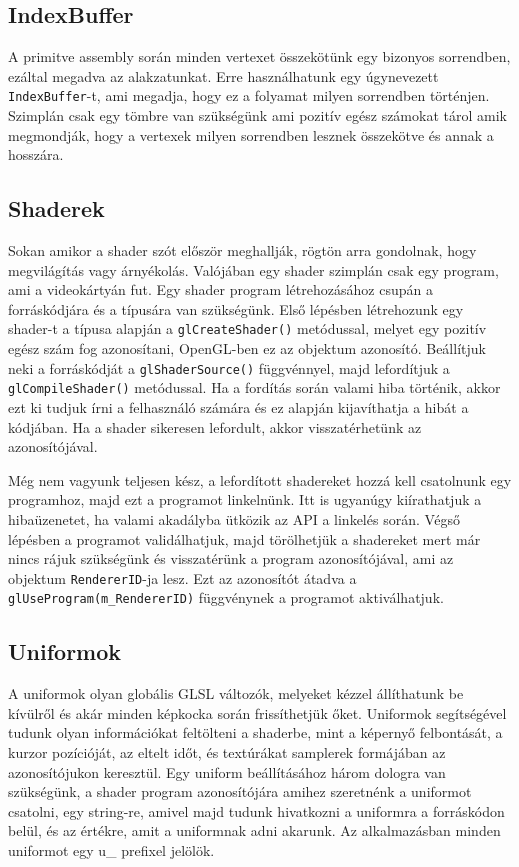 \subsection{IndexBuffer}
A primitve assembly során minden vertexet összekötünk egy bizonyos sorrendben, ezáltal megadva az alakzatunkat. Erre használhatunk egy úgynevezett \texttt{IndexBuffer}-t, ami megadja, hogy ez a folyamat milyen sorrendben történjen. Szimplán csak egy tömbre van szükségünk ami pozitív egész számokat tárol amik megmondják, hogy a vertexek milyen sorrendben lesznek összekötve és annak a hosszára.

\subsection{Shaderek}
Sokan amikor a shader szót először meghallják, rögtön arra gondolnak, hogy megvilágítás vagy árnyékolás. Valójában egy shader szimplán csak egy program, ami a videokártyán fut. Egy shader program létrehozásához csupán a forráskódjára és a típusára van szükségünk. Első lépésben létrehozunk egy shader-t a típusa alapján a \verb|glCreateShader()| metódussal, melyet egy pozitív egész szám fog azonosítani, OpenGL-ben ez az objektum azonosító. Beállítjuk neki a forráskódját a \verb|glShaderSource()| függvénnyel, majd lefordítjuk a \verb|glCompileShader()| metódussal. Ha a fordítás során valami hiba történik, akkor ezt ki tudjuk írni a felhasználó számára és ez alapján kijavíthatja a hibát a kódjában. Ha a shader sikeresen lefordult, akkor visszatérhetünk az azonosítójával.

Még nem vagyunk teljesen kész, a lefordított shadereket hozzá kell csatolnunk egy programhoz, majd ezt a programot linkelnünk. Itt is ugyanúgy  kiírathatjuk a hibaüzenetet, ha valami akadályba ütközik az API a linkelés során. Végső lépésben a programot validálhatjuk, majd törölhetjük a shadereket mert már nincs rájuk szükségünk és visszatérünk a program azonosítójával, ami az objektum \texttt{RendererID}-ja lesz. Ezt az azonosítót átadva a \texttt{glUseProgram(m_RendererID)} függvénynek a programot aktiválhatjuk.

\subsection{Uniformok}
A uniformok olyan globális GLSL változók, melyeket kézzel állíthatunk be kívülről és akár minden képkocka során frissíthetjük őket. Uniformok segítségével tudunk olyan információkat feltölteni a shaderbe, mint a képernyő felbontását, a kurzor pozícióját, az eltelt időt, és textúrákat samplerek formájában az azonosítójukon keresztül. Egy uniform beállításához három dologra van szükségünk, a shader program azonosítójára amihez szeretnénk a uniformot csatolni, egy string-re, amivel majd tudunk hivatkozni a uniformra a forráskódon belül, és az értékre, amit a uniformnak adni akarunk. Az alkalmazásban minden uniformot egy u\_ prefixel jelölök.

